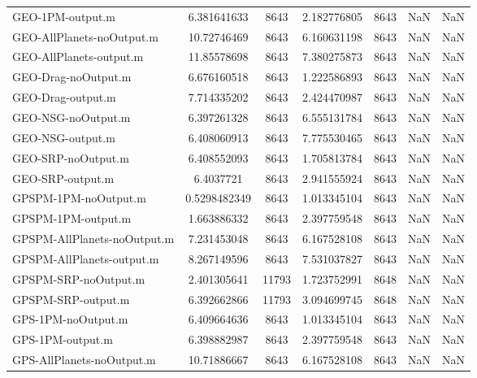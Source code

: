 \begin{table}[htbp!]
\begin{tabular}{lcccccc}
         GEO-1PM-output.m & 6.381641633 & 8643 & 2.182776805 & 8643 & NaN & NaN \\
         GEO-AllPlanets-noOutput.m & 10.72746469 & 8643 & 6.160631198 & 8643 & NaN & NaN \\
         GEO-AllPlanets-output.m & 11.85578698 & 8643 & 7.380275873 & 8643 & NaN & NaN \\
         GEO-Drag-noOutput.m & 6.676160518 & 8643 & 1.222586893 & 8643 & NaN & NaN \\
         GEO-Drag-output.m & 7.714335202 & 8643 & 2.424470987 & 8643 & NaN & NaN \\
         GEO-NSG-noOutput.m & 6.397261328 & 8643 & 6.555131784 & 8643 & NaN & NaN \\
         GEO-NSG-output.m & 6.408060913 & 8643 & 7.775530465 & 8643 & NaN & NaN \\
         GEO-SRP-noOutput.m & 6.408552093 & 8643 & 1.705813784 & 8643 & NaN & NaN \\
         GEO-SRP-output.m & 6.4037721 & 8643 & 2.941555924 & 8643 & NaN & NaN \\
         GPSPM-1PM-noOutput.m & 0.5298482349 & 8643 & 1.013345104 & 8643 & NaN & NaN \\
         GPSPM-1PM-output.m & 1.663886332 & 8643 & 2.397759548 & 8643 & NaN & NaN \\
         GPSPM-AllPlanets-noOutput.m & 7.231453048 & 8643 & 6.167528108 & 8643 & NaN & NaN \\
         GPSPM-AllPlanets-output.m & 8.267149596 & 8643 & 7.531037827 & 8643 & NaN & NaN \\
         GPSPM-SRP-noOutput.m & 2.401305641 & 11793 & 1.723752991 & 8648 & NaN & NaN \\
         GPSPM-SRP-output.m & 6.392662866 & 11793 & 3.094699745 & 8648 & NaN & NaN \\
         GPS-1PM-noOutput.m & 6.409664636 & 8643 & 1.013345104 & 8643 & NaN & NaN \\
         GPS-1PM-output.m & 6.398882987 & 8643 & 2.397759548 & 8643 & NaN & NaN \\
         GPS-AllPlanets-noOutput.m & 10.71886667 & 8643 & 6.167528108 & 8643 & NaN & NaN \\

\end{tabular}
\end{table}

